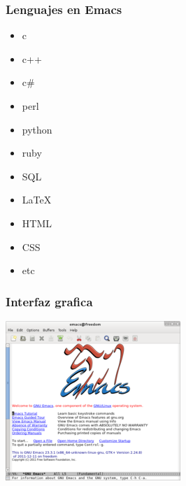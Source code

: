 \documentclass{beamer}
\begin{document}
\begin{frame}[allowframebreaks]
\frametitle{Lenguajes en Emacs}
\begin{itemize}
\item
c 
\item
c++ 
\item
c# 
\item
perl 
\item
python 
\item
ruby 
\item
SQL 
\item
LaTeX 
\item
HTML 
\item
CSS 
\item
etc
\end{itemize}
\end{frame}

\begin{frame}[allowframebreaks]
\frametitle{Interfaz grafica}
\begin{center}
\includegraphics[height=0.8\textheight]{img/interfaz.png}
\end{center}
\end{frame}
\end{document}
